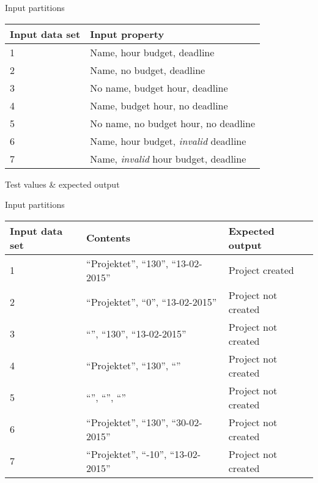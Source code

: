 Input partitions
\begin{center}
  \begin{tabular}{| l | l |}
    \hline
	Input data set & Input property \\ \hline
     1  & Name, hour budget, deadline \\ \hline
     2  & Name, no budget, deadline \\ \hline
     3  & No name, budget hour, deadline \\ \hline
     4  & Name, budget hour, no deadline \\ \hline
     5  & No name, no budget hour, no deadline \\ \hline
     6  & Name, hour budget, \emph{invalid} deadline \\ \hline
     7  & Name, \emph{invalid} hour budget, deadline \\ \hline
  \end{tabular}
\end{center}

Test values \& expected output

Input partitions
\begin{center}
  \begin{tabular}{| l | l | l |}
    \hline
	Input data set & Contents & Expected output \\ \hline
     1  & ``Projektet'', ``130'', ``13-02-2015'' & Project created  \\ \hline
     2  & ``Projektet'', ``0'', ``13-02-2015'' & Project not created  \\ \hline
     3  & ``'', ``130'', ``13-02-2015'' & Project not created  \\ \hline
     4  & ``Projektet'', ``130'', ``'' & Project not created  \\ \hline
     5  & ``'', ``'', ``'' & Project not created  \\ \hline
     6  & ``Projektet'', ``130'', ``30-02-2015'' & Project not created  \\ \hline
     7  & ``Projektet'', ``-10'', ``13-02-2015'' & Project not created  \\ \hline
  \end{tabular}
\end{center}